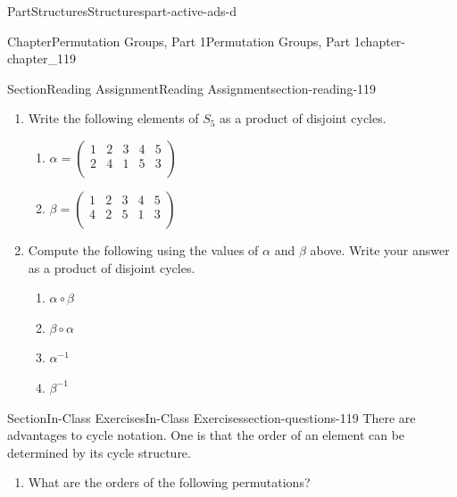 \documentclass[oneside,10pt,]{book}
\numberwithin{equation}{section}
\begin{document}
\begin{partptx}{Part}{Structures}{}{Structures}{}{}{part-active-ads-d}
\begin{chapterptx}{Chapter}{Permutation Groups, Part 1}{}{Permutation Groups, Part 1}{}{}{chapter-chapter_119}
\begin{sectionptx}{Section}{Reading Assignment}{}{Reading Assignment}{}{}{section-reading-119}
\begin{enumerate}[label=\arabic*]
\item{}Write the following elements of \(S_5\) as a product of disjoint cycles.%
\begin{multicols}{2}
\begin{enumerate}[label=(\alph*)]
\item{}\(\displaystyle \alpha=\left(
\begin{array}{ccccc}
1 & 2 & 3 & 4 & 5 \\
2 & 4 & 1 & 5 & 3 \\
\end{array}
\right)\)%
\item{}\(\displaystyle \beta=\left(
\begin{array}{ccccc}
1 & 2 & 3 & 4 & 5 \\
4 & 2 & 5 & 1 & 3 \\
\end{array}
\right)\)%
\end{enumerate}
\end{multicols}
%
\item{}Compute the following using the values of \(\alpha\) and \(\beta\) above.  Write your answer as a product of disjoint cycles.%
\begin{multicols}{2}
\begin{enumerate}[label=(\alph*)]
\item{}\(\displaystyle \alpha \circ \beta\)%
\item{}\(\displaystyle \beta \circ \alpha\)%
\item{}\(\displaystyle \alpha^{-1}\)%
\item{}\(\displaystyle \beta^{-1}\)%
\end{enumerate}
\end{multicols}
%
\end{enumerate}
%
\end{sectionptx}
%
%
\typeout{************************************************}
\typeout{************************************************}
%
\begin{sectionptx}{Section}{In-Class Exercises}{}{In-Class Exercises}{}{}{section-questions-119}
There are advantages to cycle notation.  One is that the order of an element can be determined by its cycle structure.%
\begin{enumerate}[label=\arabic*.]
\item{}What are the orders of the following permutations?%
\begin{multicols}{3}

\end{multicols}
\end{enumerate}
\end{sectionptx}
\end{chapterptx}
\end{partptx}
\end{document}
